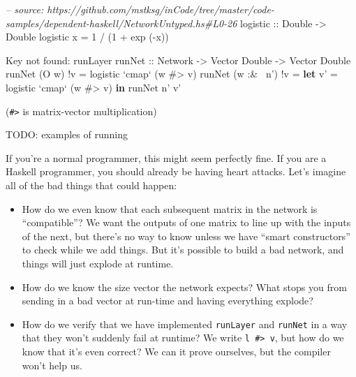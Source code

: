 \documentclass[]{article}
\newenvironment{Shaded}{}{}
\newcommand{\KeywordTok}[1]{\textcolor[rgb]{0.00,0.44,0.13}{\textbf{{#1}}}}
\newcommand{\DataTypeTok}[1]{\textcolor[rgb]{0.56,0.13,0.00}{{#1}}}
\newcommand{\DecValTok}[1]{\textcolor[rgb]{0.25,0.63,0.44}{{#1}}}
\newcommand{\CommentTok}[1]{\textcolor[rgb]{0.38,0.63,0.69}{\textit{{#1}}}}
\newcommand{\OtherTok}[1]{\textcolor[rgb]{0.00,0.44,0.13}{{#1}}}
\newcommand{\FunctionTok}[1]{\textcolor[rgb]{0.02,0.16,0.49}{{#1}}}
\newcommand{\NormalTok}[1]{{#1}}
\begin{document}
\begin{Shaded}
\begin{Highlighting}[]
\CommentTok{-- source: https://github.com/mstksg/inCode/tree/master/code-samples/dependent-haskell/NetworkUntyped.hs#L0-26}
\OtherTok{logistic ::} \DataTypeTok{Double} \OtherTok{->} \DataTypeTok{Double}
\NormalTok{logistic x }\FunctionTok{=} \DecValTok{1} \FunctionTok{/} \NormalTok{(}\DecValTok{1} \FunctionTok{+} \NormalTok{exp (}\FunctionTok{-}\NormalTok{x))}

\DataTypeTok{Key} \NormalTok{not found}\FunctionTok{:} \NormalTok{runLayer}
\OtherTok{runNet ::} \DataTypeTok{Network} \OtherTok{->} \DataTypeTok{Vector} \DataTypeTok{Double} \OtherTok{->} \DataTypeTok{Vector} \DataTypeTok{Double}
\NormalTok{runNet (}\DataTypeTok{O} \NormalTok{w)      }\FunctionTok{!}\NormalTok{v }\FunctionTok{=} \NormalTok{logistic }\OtherTok{`cmap`} \NormalTok{(w }\FunctionTok{#>} \NormalTok{v)}
\NormalTok{runNet (w }\FunctionTok{:&~} \NormalTok{n') }\FunctionTok{!}\NormalTok{v }\FunctionTok{=} \KeywordTok{let} \NormalTok{v' }\FunctionTok{=} \NormalTok{logistic }\OtherTok{`cmap`} \NormalTok{(w }\FunctionTok{#>} \NormalTok{v)}
                       \KeywordTok{in}  \NormalTok{runNet n' v'}
\end{Highlighting}
\end{Shaded}

(\texttt{\#\textgreater{}} is matrix-vector multiplication)

TODO: examples of running

If you're a normal programmer, this might seem perfectly fine. If you
are a Haskell programmer, you should already be having heart attacks.
Let's imagine all of the bad things that could happen:

\begin{itemize}
\item
  How do we even know that each subsequent matrix in the network is
  ``compatible''? We want the outputs of one matrix to line up with the
  inputs of the next, but there's no way to know unless we have ``smart
  constructors'' to check while we add things. But it's possible to
  build a bad network, and things will just explode at runtime.
\item
  How do we know the size vector the network expects? What stops you
  from sending in a bad vector at run-time and having everything
  explode?
\item
  How do we verify that we have implemented \texttt{runLayer} and
  \texttt{runNet} in a way that they won't suddenly fail at runtime? We
  write \texttt{l\ \#\textgreater{}\ v}, but how do we know that it's
  even correct? We can it prove ourselves, but the compiler won't help
  us.
\end{itemize}
\end{document}
